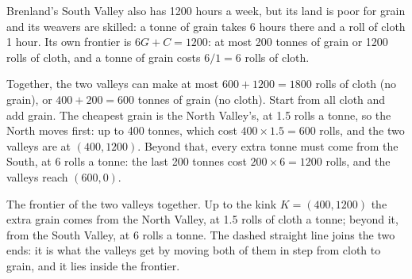 \begin{example}\label{ex:g10:production-possibility-frontier:two}
Brenland's South Valley also has \num{1200} hours a week, but its land is poor for grain and its
weavers are skilled: a tonne of grain takes 6 hours there and a roll of cloth 1 hour. Its own frontier
is $6G + C = 1200$: at most 200 tonnes of grain or \num{1200} rolls of cloth, and a tonne of grain costs
$6/1 = 6$ rolls of cloth.

Together, the two valleys can make at most $600 + 1200 = 1800$ rolls of cloth (no grain), or
$400 + 200 = 600$ tonnes of grain (no cloth). Start from all cloth and add grain. The cheapest grain is
the North Valley's, at 1.5 rolls a tonne, so the North moves first: up to 400 tonnes, which cost $400
\times 1.5 = 600$ rolls, and the two valleys are at $(400, 1200)$. Beyond that, every extra tonne must
come from the South, at 6 rolls a tonne: the last 200 tonnes cost $200 \times 6 = 1200$ rolls, and the
valleys reach $(600, 0)$.
\end{example}

\begin{omfigure}

{\small The frontier of the two valleys together. Up to the kink $K = (400, 1200)$ the extra grain
comes from the North Valley, at 1.5 rolls of cloth a tonne; beyond it, from the South Valley, at 6 rolls
a tonne. The dashed straight line joins the two ends: it is what the valleys get by moving both of
them in step from cloth to grain, and it lies inside the frontier.}
\end{omfigure}

